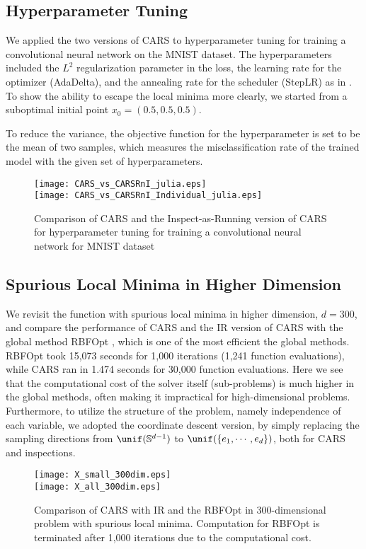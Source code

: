 \subsection*{Hyperparameter Tuning}
We applied the two versions of CARS to hyperparameter tuning for training a convolutional neural network on the MNIST dataset.
The hyperparameters included the $L^2$ regularization parameter in the loss, the learning rate for the optimizer (AdaDelta), and the annealing rate for the scheduler (StepLR) as in \cite{hutter2019automated}. To show the ability to escape the local minima more clearly, we started from a suboptimal initial point $x_0 = (0.5, 0.5, 0.5)$.

To reduce the variance, the objective function for the hyperparameter is set to be the mean of two samples, which measures the misclassification rate of the trained model with the given set of hyperparameters.

\begin{figure}
    \centering
    {\texttt{[image: CARS\_vs\_CARSRnI\_julia.eps]}}\\
    \vspace{3mm}
    {\texttt{[image: CARS\_vs\_CARSRnI\_Individual\_julia.eps]}}
    \caption{Comparison of CARS and the Inspect-as-Running version of CARS for hyperparameter tuning for training a convolutional neural network for MNIST dataset}
    \label{fig: HP Tuning - MNIST}
\end{figure}

\subsection*{Spurious Local Minima in Higher Dimension}
We revisit the function with spurious local minima in higher dimension, $d=300$, and compare the performance of CARS and the IR version of CARS with the global method RBFOpt \cite{costa2018rbfopt}, which is one of the most efficient the global methods.
RBFOpt took 15,073 seconds for 1,000 iterations (1,241 function evaluations), while CARS ran in 1.474 seconds for 30,000 function evaluations.
Here we see that the computational cost of the solver itself (sub-problems) is much higher in the global methods, often making it impractical for high-dimensional problems.
Furthermore, to utilize the structure of the problem, namely independence of each variable, we adopted the coordinate descent version, by simply replacing the sampling directions from $\unif(\mathbb{S}^{d-1})$ to $\unif(\{e_1, \cdots, e_d\})$, both for CARS and inspections.
\begin{figure}
    \centering
    {\texttt{[image: X\_small\_300dim.eps]}} \\
    \vspace{3mm}
    {\texttt{[image: X\_all\_300dim.eps]}}
    \caption{Comparison of CARS with IR and the RBFOpt in 300-dimensional problem with spurious local minima. Computation for RBFOpt is terminated after 1,000 iterations due to the computational cost.}
\end{figure}
